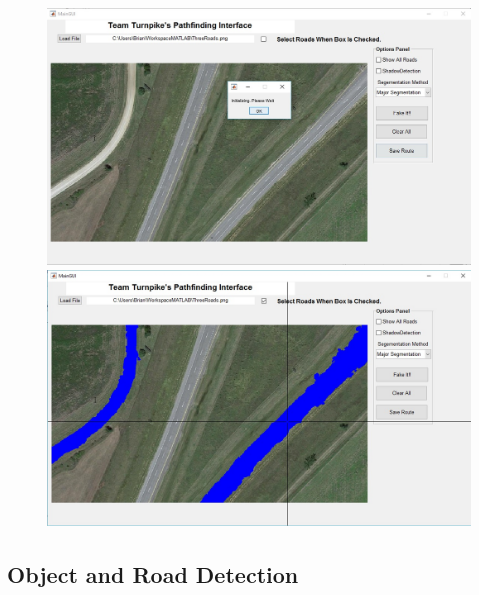 \documentclass[12pt]{article}
\begin{document}
\begin{figure}[H]
	\centering
	\includegraphics[scale = 0.5]{GUI1.jpg} \\
	\includegraphics[scale = 0.5]{GUI2.jpg}
\end{figure}

\subsection*{Object and Road Detection}
\end{document}
